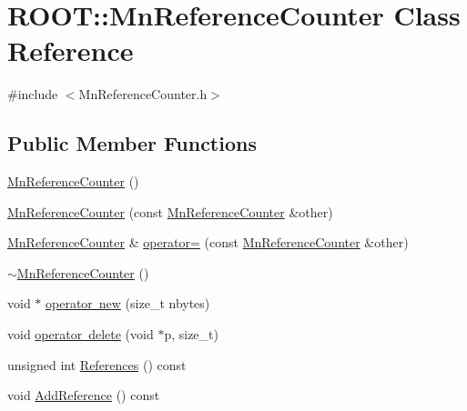 \hypertarget{classROOT_1_1Minuit2_1_1MnReferenceCounter}{}\section{R\+O\+OT\+:\+:Mn\+Reference\+Counter Class Reference}
\label{classROOT_1_1Minuit2_1_1MnReferenceCounter}


{\ttfamily \#include $<$Mn\+Reference\+Counter.\+h$>$}

\subsection*{Public Member Functions}
\begin{DoxyCompactItemize}
\item 
\mbox{\hyperlink{classROOT_1_1Minuit2_1_1MnReferenceCounter_a9d841e3e0752316d6f4988b995d834b8}{Mn\+Reference\+Counter}} ()
\item 
\mbox{\hyperlink{classROOT_1_1Minuit2_1_1MnReferenceCounter_ac12866f9e41be0b9f943326772eee89a}{Mn\+Reference\+Counter}} (const \mbox{\hyperlink{classROOT_1_1Minuit2_1_1MnReferenceCounter}{Mn\+Reference\+Counter}} \&other)
\item 
\mbox{\hyperlink{classROOT_1_1Minuit2_1_1MnReferenceCounter}{Mn\+Reference\+Counter}} \& \mbox{\hyperlink{classROOT_1_1Minuit2_1_1MnReferenceCounter_a6a952f3f15d5dcfa10647c9df13a7caa}{operator=}} (const \mbox{\hyperlink{classROOT_1_1Minuit2_1_1MnReferenceCounter}{Mn\+Reference\+Counter}} \&other)
\item 
\mbox{\hyperlink{classROOT_1_1Minuit2_1_1MnReferenceCounter_ab78e13c79097fd8f5983dada7fab2f3d}{$\sim$\+Mn\+Reference\+Counter}} ()
\item 
void $\ast$ \mbox{\hyperlink{classROOT_1_1Minuit2_1_1MnReferenceCounter_af7e9fdee3f67cac68328bbd05f6f2958}{operator new}} (size\+\_\+t nbytes)
\item 
void \mbox{\hyperlink{classROOT_1_1Minuit2_1_1MnReferenceCounter_a792b5f277bb7df7c032c603eed5ae6f9}{operator delete}} (void $\ast$p, size\+\_\+t)
\item 
unsigned int \mbox{\hyperlink{classROOT_1_1Minuit2_1_1MnReferenceCounter_a8c4e8a4427e3f5eeaad4001a364f8a5a}{References}} () const
\item 
void \mbox{\hyperlink{classROOT_1_1Minuit2_1_1MnReferenceCounter_afab040d933d93fd7f86b3c14a8d1910d}{Add\+Reference}} () const
\item 

\end{DoxyCompactItemize}
